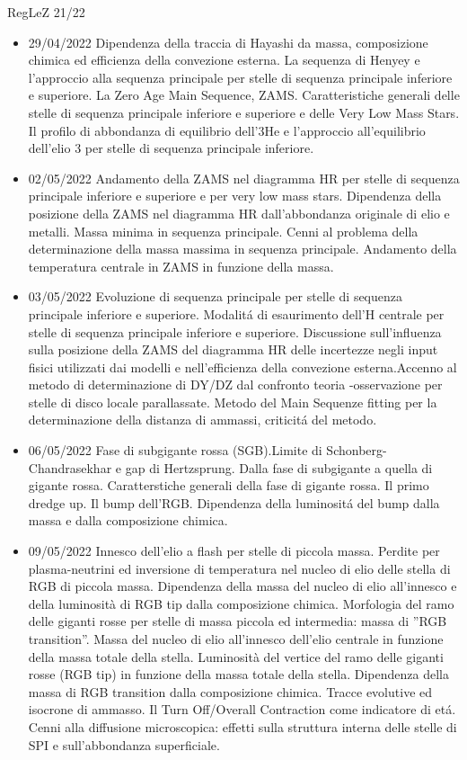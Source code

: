 \begin{frame}[allowframebreaks]{RegLeZ 21/22}
\begin{itemize}
\item 29/04/2022 Dipendenza della traccia di Hayashi da massa, composizione chimica ed efficienza della convezione esterna. La sequenza di Henyey e l'approccio alla sequenza principale per stelle di sequenza principale inferiore e superiore. La Zero Age Main Sequence, ZAMS. Caratteristiche generali delle stelle di sequenza principale inferiore e superiore e delle Very Low Mass Stars. Il profilo di abbondanza di equilibrio dell'3He e l'approccio all'equilibrio dell'elio 3 per stelle di sequenza principale inferiore.
\item 02/05/2022 Andamento della ZAMS nel diagramma HR per stelle di sequenza principale inferiore e superiore e per very low mass stars. Dipendenza della posizione della ZAMS nel diagramma HR dall'abbondanza originale di elio e metalli. Massa minima in sequenza principale. Cenni al problema della determinazione della massa massima in sequenza principale. Andamento della temperatura centrale in ZAMS in funzione della massa.
\item 03/05/2022 Evoluzione di sequenza principale per stelle di sequenza principale inferiore e superiore. Modalit\'a di esaurimento dell'H centrale per stelle di sequenza principale inferiore e superiore. Discussione sull'influenza sulla posizione della ZAMS del diagramma HR delle incertezze negli input fisici utilizzati dai modelli e nell'efficienza della convezione esterna.Accenno al metodo di determinazione di DY/DZ dal confronto teoria -osservazione per stelle di disco locale parallassate. Metodo del Main Sequenze fitting per la determinazione della distanza di ammassi, criticit\'a del metodo.
\item 06/05/2022 Fase di subgigante rossa (SGB).Limite di Schonberg-Chandrasekhar e gap di Hertzsprung. Dalla fase di subgigante a quella di gigante rossa. Caratterstiche generali della fase di gigante rossa. Il primo dredge up. Il bump dell'RGB. Dipendenza della luminosit\'a del bump dalla massa e dalla composizione chimica.
\item 09/05/2022 Innesco dell'elio a flash per stelle di piccola massa. Perdite per plasma-neutrini ed inversione di temperatura nel nucleo di elio delle stella di RGB di piccola massa. Dipendenza della massa del nucleo di elio all'innesco e della luminosità di RGB tip dalla composizione chimica. Morfologia del ramo delle giganti rosse per stelle di massa piccola ed intermedia: massa di ''RGB transition''. Massa del nucleo di elio all'innesco dell'elio centrale in funzione della massa totale della stella. Luminosità del vertice del ramo delle giganti rosse (RGB tip) in funzione della massa totale della stella. Dipendenza della massa di RGB transition dalla composizione chimica. Tracce evolutive ed isocrone di ammasso. Il Turn Off/Overall Contraction come indicatore di et\'a. Cenni alla diffusione microscopica: effetti sulla struttura interna delle stelle di SPI e sull'abbondanza superficiale.

\end{itemize}
\end{frame}
